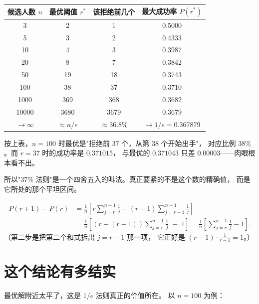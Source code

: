 \documentclass[UTF8,11pt,fontset=macnew]{ctexart}
\begin{document}
\begin{center}
\begin{tabular}{c c c c}
\toprule
候选人数 $n$ & 最优阈值 $r^*$ & 该拒绝前几个 & 最大成功率 $P(r^*)$ \\
\midrule
3     & 2   & 1    & 0.5000 \\
5     & 3   & 2    & 0.4333 \\
10    & 4   & 3    & 0.3987 \\
20    & 8   & 7    & 0.3842 \\
50    & 19  & 18   & 0.3743 \\
100   & 38  & 37   & 0.3710 \\
1000  & 369 & 368  & 0.3682 \\
10000 & 3680 & 3679 & 0.3679 \\
\midrule
$\to\infty$ & $\approx n/e$ & $\approx 36.8\%$ & $\to 1/e=0.367879$ \\
\bottomrule
\end{tabular}
\end{center}

\begin{warnbox}[一个小细节：$n=100$ 时严格最优是 $r=38$]
按上表，$n=100$ 时最优是"拒绝前 $37$ 个，从第 $38$ 个开始出手"，
对应比例 $38\%$。而 $r=37$ 时的成功率是 $0.371015$，
与最优的 $0.371043$ 只差 $0.00003$——肉眼根本看不出。

所以"$37\%$ 法则"是一个四舍五入的叫法。真正要紧的不是这个数的精确值，
而是它所处的那个平坦区间。
\end{warnbox}

\begin{keybox}[$P(r+1)-P(r)$ 怎么来的]
\begin{align*}
P(r+1)-P(r)
&=\frac1n\left[r\sum_{j=r}^{n-1}\frac1j-(r-1)\sum_{j=r-1}^{n-1}\frac1j\right]\\
&=\frac1n\left[(r-(r-1))\sum_{j=r}^{n-1}\frac1j\;-\;1\right]
=\frac1n\left[\sum_{j=r}^{n-1}\frac1j-1\right].
\end{align*}
（第二步是把第二个和式拆出 $j=r-1$ 那一项，
它正好是 $(r-1)\cdot\frac{1}{r-1}=1$。）
\end{keybox}

\section{这个结论有多结实}

最优解附近太平了，这是 $1/e$ 法则真正的价值所在。
以 $n=100$ 为例：
\end{document}

